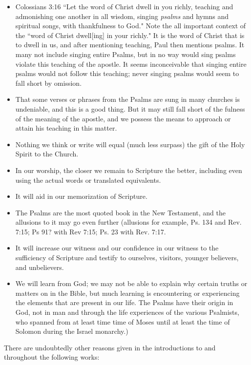 \documentclass{article}
\begin{document}
\begin{itemize}
	\item Colossians 3:16 ``Let the word of Christ dwell in you richly, teaching and admonishing one another in all wisdom, singing \emph{psalms} and hymns and spiritual songs, with thankfulness to God." Note the all important context of the ``word of Christ dwell[ing] in your richly." It is the word of Christ that is to dwell in us, and after mentioning teaching, Paul then mentions psalms.  It many not include singing entire Psalms, but in no way would sing psalms violate this teaching of the apostle.  It seems inconceivable that singing entire psalms would not follow this teaching; never singing psalms would seem to fall short by omission.
	\item That some verses or phrases from the Psalms are sung in many churches is undeniable, and this is a good thing.  But it may still fall short of the fulness of the meaning of the apostle, and we possess the means to approach or attain his teaching in this matter.
	\item Nothing we think or write will equal (much less surpass) the gift of the Holy Spirit to the Church.
	\item In our worship, the closer we remain to Scripture the better, including even using the actual words or translated equivalents.
	\item It will aid in our memorization of Scripture.
	\item The Psalms are the most quoted book in the New Testament, and the allusions to it may go even further (allusions for example, Ps. 134 and Rev. 7:15; Ps 91? with Rev 7:15; Ps. 23 with Rev. 7:17.
	\item It will increase our witness and our confidence in our witness to the sufficiency of Scripture and testify to ourselves, visitors, younger believers, and unbelievers.  
	\item We will learn from God; we may not be able to explain why certain truths or matters on in the Bible, but much learning is encountering or experiencing the elements that are present in our life.  The Psalms have their origin in God, not in man and through the life experiences of the various Psalmists, who spanned from at least time time of Moses until at least the time of Solomon during the Israel monarchy.)
\end{itemize}


There are undoubtedly other reasons given in the introductions to and throughout the following works:
\end{document}
